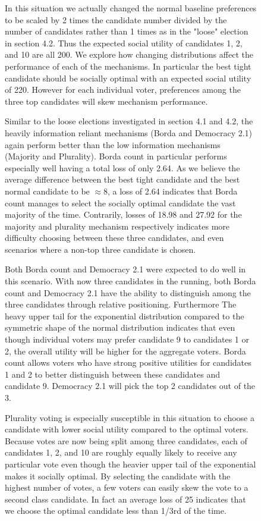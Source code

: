 \documentclass[11pt]{scrartcl}
\begin{document}
\begin{figure}[H]
In this situation we actually changed the normal baseline preferences to be scaled by 2 times the candidate number divided by the number of candidates rather than 1 times as in the "loose" election in section 4.2. Thus the expected social utility of candidates 1, 2, and 10 are all 200. We explore how changing distributions affect the performance of each of the mechanisms. In particular the best tight candidate should be socially optimal with an expected social utility of 220. However for each individual voter, preferences among the three top candidates will skew mechanism performance.

Similar to the loose elections investigated in section 4.1 and 4.2, the heavily information reliant mechanisms (Borda and Democracy 2.1) again perform better than the low information mechanisms (Majority and Plurality). Borda count in particular performs especially well having a total loss of only 2.64. As we believe the average difference between the best tight candidate and the best normal candidate to be $\approx 8$, a loss of 2.64 indicates that Borda count manages to select the socially optimal candidate the vast majority of the time. Contrarily, losses of 18.98 and 27.92 for the majority and plurality mechanism respectively indicates more difficulty choosing between these three candidates, and even scenarios where a non-top three candidate is chosen.

Both Borda count and Democracy 2.1 were expected to do well in this scenario. With now three candidates in the running, both Borda count and Democracy 2.1 have the ability to distinguish among the three candidates through relative positioning. Furthermore The heavy upper tail for the exponential distribution compared to the symmetric shape of the normal distribution indicates that even though individual voters may prefer candidate 9 to candidates 1 or 2, the overall utility will be higher for the aggregate voters. Borda count allows voters who have strong positive utilities for candidates 1 and 2 to better distinguish between these candidates and candidate 9. Democracy 2.1 will pick the top 2 candidates out of the 3.

Plurality voting is especially susceptible in this situation to choose a candidate with lower social utility compared to the optimal voters. Because votes are now being split among three candidates, each of candidates 1, 2, and 10 are roughly equally likely to receive any particular vote even though the heavier upper tail of the exponential makes it socially optimal. By selecting the candidate with the highest number of votes, a few voters can easily skew the vote to a second class candidate. In fact an average loss of 25 indicates that we choose the optimal candidate less than 1/3rd of the time.


\end{figure}
\end{document}
